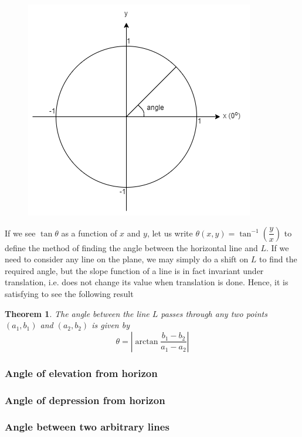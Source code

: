 \documentclass[12pt]{article}
\newtheorem*{theorem}{Theorem}
\begin{document}
    \begin{figure}[H]
        \centering
        \includegraphics[scale=0.8]{rectpolar.png}
    \end{figure}

    If we see $\tan{\theta}$ as a function of $x$ and $y$, let us write $\theta(x,y)=\tan^{-1}(\dfrac{y}{x})$ to define the method of finding the angle between the horizontal line and $L$. If we need to consider any line on the plane, we may simply do a shift on $L$ to find the required angle, but the slope function of a line is in fact invariant under translation, i.e. does not change its value when translation is done. Hence, it is satisfying to see the following result

    \begin{theorem}
        The angle between the line $L$ passes through any two points $(a_1,b_1)$ and $(a_2,b_2)$ is given by \[\theta=|\arctan{\frac{b_1-b_2}{a_1-a_2}}|\]
    \end{theorem}

    \subsubsection*{Angle of elevation from horizon}



    \subsubsection*{Angle of depression from horizon}

    \subsubsection*{Angle between two arbitrary lines}
\end{document}
